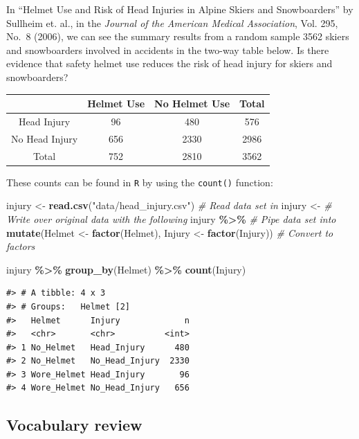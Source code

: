 \documentclass[
]{report}
\newenvironment{Shaded}{\begin{snugshade}}{\end{snugshade}}
\newcommand{\CommentTok}[1]{\textcolor[rgb]{0.56,0.35,0.01}{\textit{#1}}}
\newcommand{\KeywordTok}[1]{\textcolor[rgb]{0.13,0.29,0.53}{\textbf{#1}}}
\newcommand{\NormalTok}[1]{#1}
\newcommand{\OperatorTok}[1]{\textcolor[rgb]{0.81,0.36,0.00}{\textbf{#1}}}
\newcommand{\StringTok}[1]{\textcolor[rgb]{0.31,0.60,0.02}{#1}}
\begin{document}
In ``Helmet Use and Risk of Head Injuries in Alpine Skiers and Snowboarders'' by Sullheim et. al., in the \emph{Journal of the American Medical Association}, Vol. 295, No.~8 (2006), we can see the summary results from a random sample 3562 skiers and snowboarders involved in accidents in the two-way table below. Is there evidence that safety helmet use reduces the risk of head injury for skiers and snowboarders?

\begin{longtable}[]{@{}cccc@{}}
\toprule
& Helmet Use & No Helmet Use & Total\tabularnewline
\midrule
\endhead
Head Injury & 96 & 480 & 576\tabularnewline
No Head Injury & 656 & 2330 & 2986\tabularnewline
Total & 752 & 2810 & 3562\tabularnewline
\bottomrule
\end{longtable}

These counts can be found in \texttt{R} by using the \texttt{count()} function:

\begin{Shaded}
\begin{Highlighting}[]
\NormalTok{injury \textless{}{-}}\StringTok{ }\KeywordTok{read.csv}\NormalTok{(}\StringTok{"data/head\_injury.csv"}\NormalTok{) }\CommentTok{\# Read data set in}
\NormalTok{injury \textless{}{-}}\StringTok{ }\CommentTok{\# Write over original data with the following}
\StringTok{  }\NormalTok{injury }\OperatorTok{\%\textgreater{}\%}\StringTok{ }\CommentTok{\# Pipe data set into}
\StringTok{  }\KeywordTok{mutate}\NormalTok{(Helmet \textless{}{-}}\StringTok{ }\KeywordTok{factor}\NormalTok{(Helmet),}
\NormalTok{         Injury \textless{}{-}}\StringTok{ }\KeywordTok{factor}\NormalTok{(Injury)) }\CommentTok{\# Convert to factors}

\NormalTok{injury }\OperatorTok{\%\textgreater{}\%}\StringTok{ }\KeywordTok{group\_by}\NormalTok{(Helmet) }\OperatorTok{\%\textgreater{}\%}\StringTok{ }\KeywordTok{count}\NormalTok{(Injury)}
\end{Highlighting}
\end{Shaded}

\begin{verbatim}
#> # A tibble: 4 x 3
#> # Groups:   Helmet [2]
#>   Helmet      Injury             n
#>   <chr>       <chr>          <int>
#> 1 No_Helmet   Head_Injury      480
#> 2 No_Helmet   No_Head_Injury  2330
#> 3 Wore_Helmet Head_Injury       96
#> 4 Wore_Helmet No_Head_Injury   656
\end{verbatim}

\hypertarget{vocabulary-review}{%
\subsection*{Vocabulary review}\label{vocabulary-review}}
\end{document}
